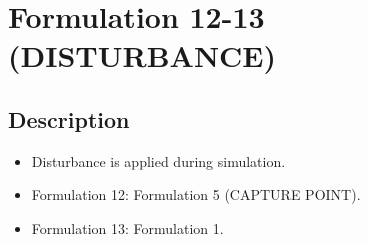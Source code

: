 \section{Formulation 12-13 (DISTURBANCE)}


\subsection{Description}
\begin{itemize}
    \item Disturbance is applied during simulation.
    \item Formulation 12: Formulation 5 (CAPTURE POINT).
    \item Formulation 13: Formulation 1.
\end{itemize}
